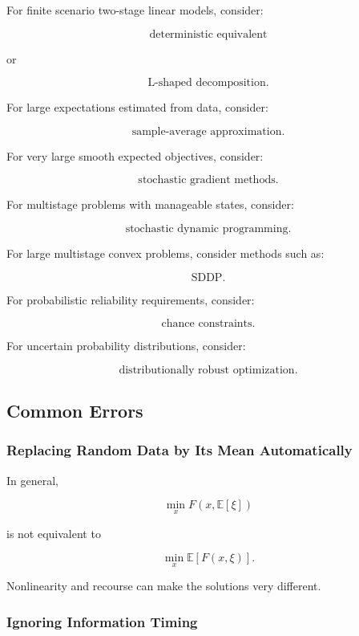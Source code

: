 For finite scenario two-stage linear models, consider:

\[
\boxed{
\text{deterministic equivalent}
}
\]

or

\[
\boxed{
\text{L-shaped decomposition}.
}
\]

For large expectations estimated from data, consider:

\[
\boxed{
\text{sample-average approximation}.
}
\]

For very large smooth expected objectives, consider:

\[
\boxed{
\text{stochastic gradient methods}.
}
\]

For multistage problems with manageable states, consider:

\[
\boxed{
\text{stochastic dynamic programming}.
}
\]

For large multistage convex problems, consider methods such as:

\[
\boxed{
\text{SDDP}.
}
\]

For probabilistic reliability requirements, consider:

\[
\boxed{
\text{chance constraints}.
}
\]

For uncertain probability distributions, consider:

\[
\boxed{
\text{distributionally robust optimization}.
}
\]

\subsection{Common Errors}
\label{subsec:stochastic-optimization-common-errors}

\subsubsection{Replacing Random Data by Its Mean Automatically}

In general,

\[
\boxed{
\min_x
F
(
x,\mathbb{E}[\xi]
)
}
\]

is not equivalent to

\[
\boxed{
\min_x
\mathbb{E}
[
F(x,\xi)
].
}
\]

Nonlinearity and recourse can make the solutions very different.

\subsubsection{Ignoring Information Timing}

